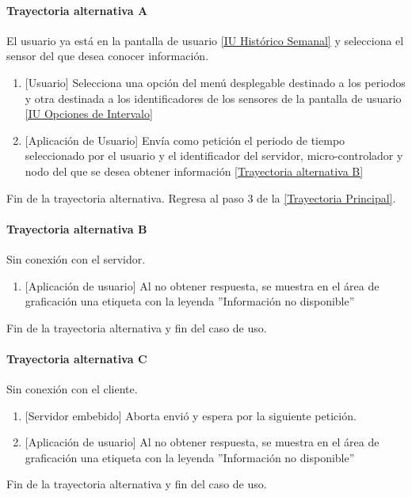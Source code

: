 \paragraph{Trayectoria alternativa A} \label{SUB-U-CU1.3:TA}
    El usuario ya está en la pantalla de usuario \hyperref[fig:Historico semanal]{[IU Histórico Semanal]}  y selecciona el sensor del que desea conocer información.
	\begin{enumerate}[label=A\arabic*.]
	    \item {[Usuario]} Selecciona una opción del menú desplegable destinado a los periodos y otra destinada a los identificadores de los sensores de la pantalla de usuario \hyperref[fig:Opciones de Intervalo]{[IU Opciones de Intervalo]} 
	    \item {[Aplicación de Usuario]} Envía como petición el periodo de tiempo seleccionado por el usuario y el identificador del servidor, micro-controlador y nodo del que se desea obtener información \hyperref[SUB-U-CU1.3:TB]{[Trayectoria alternativa B]} 
	\end{enumerate}
	Fin de la trayectoria alternativa. Regresa al paso 3 de la \hyperref[SUB-U-CU1.3:TP]{[Trayectoria Principal]}.
	
\paragraph{Trayectoria alternativa B} \label{SUB-U-CU1.3:TB}
	Sin conexión con el servidor.
	\begin{enumerate}[label=B\arabic*.]
		\item {[Aplicación de usuario]} Al no obtener respuesta, se muestra en el área de graficación una etiqueta con la leyenda ''Información no disponible''
	\end{enumerate}
	Fin de la trayectoria alternativa y fin del caso de uso.

\paragraph{Trayectoria alternativa C} \label{SUB-U-CU1.3:TC}
	Sin conexión con el cliente.
	\begin{enumerate}[label=C\arabic*.]
		\item {[Servidor embebido]} Aborta envió y espera por la siguiente petición.
		\item {[Aplicación de usuario]} Al no obtener respuesta, se muestra en el área de graficación una etiqueta con la leyenda ''Información no disponible''
	\end{enumerate}
	Fin de la trayectoria alternativa y fin del caso de uso.
	
